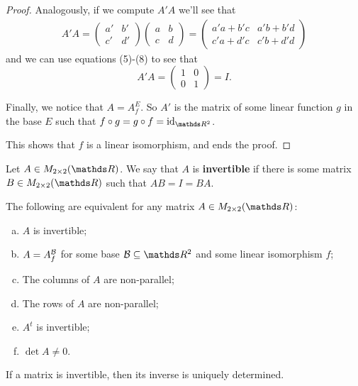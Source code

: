\begin{proof}
	Analogously, if we compute $A'A$ we'll see that
	\begin{align*}
		A'A=\begin{pmatrix}
		a'&b'\\c'&d'
		\end{pmatrix}\begin{pmatrix}
		a&b\\c&d
		\end{pmatrix}=\begin{pmatrix}
		a'a+b'c&a'b+b'd\\
		c'a+d'c&c'b+d'd
		\end{pmatrix}
	\end{align*}and we can use equations (5)-(8) to see that 
	\[A'A=\begin{pmatrix}
	1&0\\0&1
	\end{pmatrix}=I.\]
	
	Finally, we notice that $A=A_f^{E}$. So $A'$ is the matrix of some linear function $g$ in the base $E$ such that $f\circ g=g\circ f=\id_{\R^2}$.
	
	This shows that $f$ is a linear isomorphism, and ends the proof.
\end{proof}

\vspace{5pt}
\begin{df}
	Let $A\in M_{2\times 2}(\R)$. We say that $A$ is \textbf{invertible} if there is some matrix $B\in M_{2\times 2}(\R)$ such that $AB=I=BA$.
\end{df}

\begin{cor}
	The following are equivalent for any matrix $A\in M_{2\times 2}(\R)$:
	\begin{enumerate}[a)]
		\item $A$ is invertible;
		\item $A=A_f^{\mathcal B}$ for some base $\mc B\subseteq \R^2$ and some linear isomorphism $f$;
		\item The columns of $A$ are non-parallel;
		\item The rows of $A$ are non-parallel;
		\item $A^t$ is invertible;
		\item $\det A\neq 0$.
	\end{enumerate}
\end{cor}
\begin{cor}
	If a matrix is invertible, then its inverse is uniquely determined.
\end{cor}


